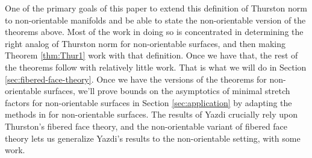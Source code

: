 One of the primary goals of this paper to extend this definition of Thurston norm to non-orientable
manifolds and be able to state the non-orientable version of the theorems above. Most of the work in
doing so is concentrated in determining the right analog of Thurston norm for non-orientable
surfaces, and then making Theorem \ref{thm:Thur1} work with that definition. Once we have that, the
rest of the theorems follow with relatively little work. That is what we will do in Section
\ref{sec:fibered-face-theory}. Once we have the versions of the theorems for non-orientable
surfaces, we'll prove bounds on the asymptotics of minimal stretch factors for non-orientable
surfaces in Section \ref{sec:application} by adapting the methods in \cite{yazdi2018pseudo} for
non-orientable surfaces. The results of Yazdi crucially rely upon Thurston's fibered face theory,
and the non-orientable variant of fibered face theory lets us generalize Yazdi's results to the
non-orientable setting, with some work.
